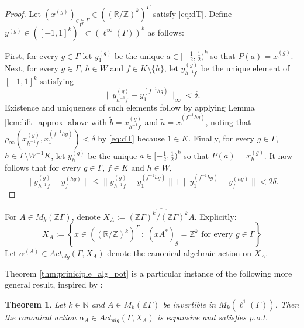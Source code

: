 \documentclass[oneside,english]{amsart}
\newtheorem{thm}{Theorem}[section]
\theoremstyle{definition}
\newcommand{\ZZ}{\mathbb{Z}}
\newcommand{\RR}{\mathbb{R}}
\newcommand{\dT}{\rho_\infty}
\newcommand{\Alg}[2]{\mathit{Act}_{\mathit{alg}}({#1},{#2})}
\begin{document}
\begin{proof}
Let $(x^{(g)})_{g \in \Gamma} \in ( (\RR/\ZZ)^k)^\Gamma$  satisfy \eqref{eq:dT}.
Define $y^{(g)} \in ([-1,1]^k)^\Gamma \subset (\ell^\infty(\Gamma))^k$  as follows:

First, for every $g \in \Gamma$ let $y^{(g)}_1$ be the unique $a \in [-\frac{1}{2},\frac{1}{2})^k$ so that $P(a)= x^{(g)}_1$.
Next, for every $g \in \Gamma$, $h \in W$ and $f \in K \setminus \{h\}$, let $y^{(g)}_{h^{-1}f}$
be the unique element of $[-1,1]^k$ satisfying
$$\|y^{(g)}_{h^{-1}f}- y^{(f^{-1}hg)}_1\|_\infty < \delta.$$
Existence and uniqueness of such elements follow by applying  Lemma \ref{lem:lift_approx} above with $\tilde b =x^{(g)}_{h^{-1}f}$ and $\tilde a =x^{(f^{-1}hg)}_1$, noting that  $\dT(x^{(g)}_{h^{-1}f},x^{(f^{-1}hg)}_1)< \delta$ by \eqref{eq:dT} because $1 \in K$.
Finally, for every $g \in \Gamma$, $h \in \Gamma \setminus W^{-1}K$, let
$y^{(g)}_h$ be the unique $a \in [-\frac{1}{2},\frac{1}{2})^k$ so that $P(a)= x^{(g)}_h$.
It now follows that for every $g \in \Gamma$, $f \in K$ and $h \in W$,
$$\|y^{(g)}_{h^{-1}f}- y^{(hg)}_f\| \le \|y^{(g)}_{h^{-1}f}- y^{(f^{-1}hg)}_1\| + \|y^{(f^{-1}hg)}_1 - y^{(hg)}_f\| < 2\delta.$$
\end{proof}
For $A \in M_k(\mathbb{Z}\Gamma)$, denote $\displaystyle X_A := \widehat{(\mathbb{Z}\Gamma)^k / ( \mathbb{Z}\Gamma)^kA}$.
Explicitly:
\begin{equation}\label{eq:def_X_A}
X_A := \left\{ x \in ((\mathbb{R}/\mathbb{Z})^k)^\Gamma~:~ (xA^*)_g = \mathbb{Z}^k \mbox{ for every } g \in \Gamma\right\}
\end{equation}
Let $\alpha^{(A)} \in \Alg{\Gamma}{X_A}$ denote the canonical  algebraic action on $X_A$.

Theorem \ref{thm:priniciple_alg_pot}  is a particular instance of the  following more general result, inspired by \cite{MR3314515}:
\begin{thm}\label{thm:X_A_SFT}
Let %
$k \in \mathbb{N}$ and $A \in M_k(\mathbb{Z}\Gamma)$ be invertible in $M_k(\ell^1(\Gamma))$. Then the canonical action
$ \alpha_A \in \Alg{\Gamma}{X_A}$ is expansive and satisfies p.o.t.
\end{thm}
\end{document}
